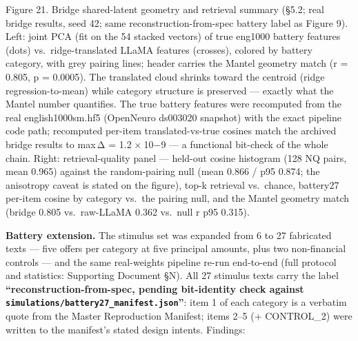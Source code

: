 \documentclass[
]{article}
\begin{document}
Figure 21. Bridge shared-latent geometry and retrieval summary (§5.2;
real bridge results, seed 42; same reconstruction-from-spec battery
label as Figure 9). Left: joint PCA (fit on the 54 stacked vectors) of
true eng1000 battery features (dots) vs.~ridge-translated LLaMA features
(crosses), colored by battery category, with grey pairing lines; header
carries the Mantel geometry match ({r = 0.805}, {p = 0.0005}). The
translated cloud shrinks toward the centroid (ridge regression-to-mean)
while category structure is preserved --- exactly what the Mantel number
quantifies. The true battery features were recomputed from the real
english1000sm.hf5 (OpenNeuro ds003020 snapshot) with the exact pipeline
code path; recomputed per-item translated-vs-true cosines match the
archived bridge results to {max \textbar{}Δ\textbar{} = 1.2 × 10−9} ---
a functional bit-check of the whole chain. Right: retrieval-quality
panel --- held-out cosine histogram (128 NQ pairs, mean 0.965) against
the random-pairing null (mean 0.866 / p95 0.874; the anisotropy caveat
is stated on the figure), top-{k} retrieval vs.~chance, battery27
per-item cosine by category vs.~the pairing null, and the Mantel
geometry match (bridge 0.805 vs.~raw-LLaMA 0.362 vs.~null
{\textbar{}r\textbar{}} p95 0.315).

\textbf{Battery extension.} The stimulus set was expanded from 6 to 27
fabricated texts --- five offers per category at five principal amounts,
plus two non-financial controls --- and the same real-weights pipeline
re-run end-to-end (full protocol and statistics: Supporting Document
§N). All 27 stimulus texts carry the label
\textbf{``reconstruction-from-spec, pending bit-identity check against
\texttt{simulations/battery27\_manifest.json}''}: item 1 of each
category is a verbatim quote from the Master Reproduction Manifest;
items 2--5 (+ CONTROL\_2) were written to the manifest's stated design
intents. Findings:
\end{document}
